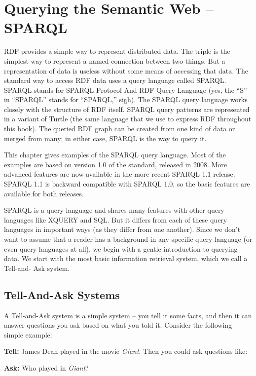 \chapter{Querying the Semantic Web -- SPARQL}
\label{ch6}

RDF provides a simple way to represent distributed data. The triple is
the simplest way to represent a named connection between two things. But
a representation of data is useless without some means of accessing that
data. The standard way to access RDF data uses a query language called
SPARQL. SPARQL stands for SPARQL Protocol And RDF Query Language (yes,
the ``S'' in ``SPARQL'' stands for ``SPARQL,'' sigh). The SPARQL query
language works closely with the structure of RDF itself. SPARQL query
patterns are represented in a variant of Turtle (the same language that
we use to express RDF throughout this book). The queried RDF graph can be created from one
kind of data or merged from many; in either case, SPARQL is the way to
query it.

This chapter gives examples of the SPARQL query language. Most of the
examples are based on version 1.0 of the standard, released in 2008. More advanced features 
are now available in the more recent SPARQL 1.1 release.  SPARQL 1.1 is backward compatible with
SPARQL 1.0, so the basic features are available for both releases. 

SPARQL is a query language and shares many features with other query
languages like XQUERY and SQL. But it differs from each of these query
languages in important ways (as they differ from one another). Since we
don't want to assume that a reader has a background in any specific
query language (or even query languages at all), we begin with a gentle
introduction to querying data. We start with the most basic information
retrieval system, which we call a Tell-and- Ask system.

\section{Tell-And-Ask Systems}

A Tell-and-Ask system is a simple system -- you tell it some facts, and
then it can answer questions you ask based on what you told it. Consider the following simple example:

\textbf{Tell:} James Dean played in the movie \emph{Giant}. Then you could ask
questions like:

\textbf{Ask:} Who played in \emph{Giant}?

